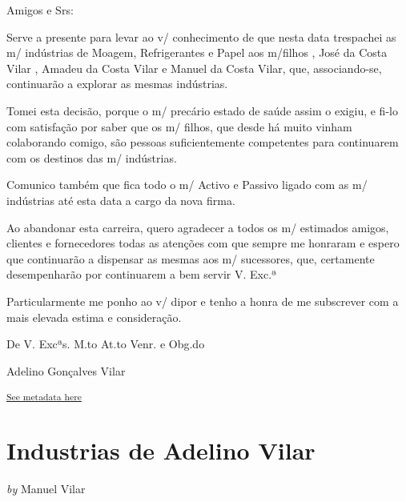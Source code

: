 \documentclass{article}
\begin{document}
    \begin{center}
        \begin{minipage}{0.9\textwidth}
            \setlength{\parskip}{0.2cm}
            \setlength{\parindent}{0cm}
            \fontsize{12pt}{14pt}\selectfont
            


Amigos e Srs:

Serve a presente para levar ao v/ conhecimento de que nesta data
trespachei as m/ indústrias de Moagem, Refrigerantes e Papel aos
m/filhos , José da Costa Vilar , Amadeu da Costa Vilar e Manuel da Costa Vilar, que, associando-se, continuarão a explorar as mesmas
indústrias.

Tomei esta decisão, porque o m/ precário estado de saúde assim o exigiu,
e fi-lo com satisfação por saber que os m/ filhos, que desde há muito
vinham colaborando comigo, são pessoas suficientemente competentes para
continuarem com os destinos das m/ indústrias.

Comunico também que fica todo o m/ Activo e Passivo ligado com as m/
indústrias até esta data a cargo da nova firma.

Ao abandonar esta carreira, quero agradecer a todos os m/ estimados
amigos, clientes e fornecedores todas as atenções com que sempre me
honraram e espero que continuarão a dispensar as mesmas aos m/
sucessores, que, certamente desempenharão por continuarem a bem servir
V. Exc.ª

Particularmente me ponho ao v/ dipor e tenho a honra de me subscrever
com a mais elevada estima e consideração.

De V. Excªs. M.to At.to Venr. e Obg.do

Adelino Gonçalves Vilar

        \end{minipage}
    \end{center}

    
        \textsuperscript{\hyperref[table:\arabic{tablecounter}]{See metadata here}}
    


\newpage
\section{Industrias de Adelino Vilar}


    
        \textit{by} Manuel Vilar
    
\end{document}
